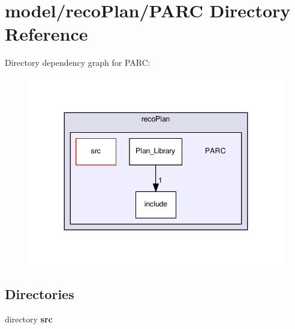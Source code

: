 \section{model/reco\+Plan/\+P\+A\+RC Directory Reference}
\label{dir_24474c53cb1eec01d83dfb2d02ae2b11}
Directory dependency graph for P\+A\+RC\+:
\nopagebreak
\begin{figure}[H]
\begin{center}
\leavevmode
\includegraphics[width=344pt]{dir_24474c53cb1eec01d83dfb2d02ae2b11_dep}
\end{center}
\end{figure}
\subsection*{Directories}
\begin{DoxyCompactItemize}
\item 
directory \textbf{ src}
\end{DoxyCompactItemize}
